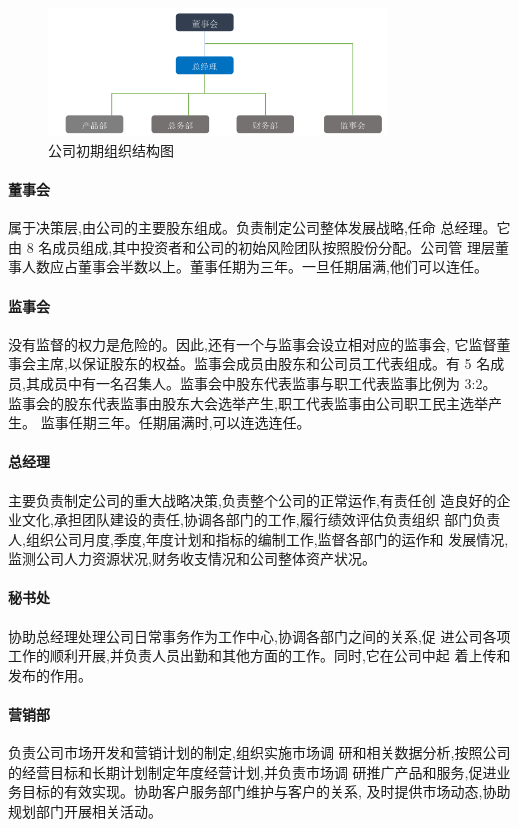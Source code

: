 \begin{figure}[htbp]
\centering
\label{figure:early-struct}
\includegraphics[width=0.8\textwidth]{../images/company/早期结构}
\caption{公司初期组织结构图}
\end{figure}

\paragraph{董事会}
属于决策层,由公司的主要股东组成。负责制定公司整体发展战略,任命
总经理。它由 8 名成员组成,其中投资者和公司的初始风险团队按照股份分配。公司管
理层董事人数应占董事会半数以上。董事任期为三年。一旦任期届满,他们可以连任。
\paragraph{ 监事会 }
没有监督的权力是危险的。因此,还有一个与监事会设立相对应的监事会,
它监督董事会主席,以保证股东的权益。监事会成员由股东和公司员工代表组成。有 5
名成员,其成员中有一名召集人。监事会中股东代表监事与职工代表监事比例为 3:2。
监事会的股东代表监事由股东大会选举产生,职工代表监事由公司职工民主选举产生。
监事任期三年。任期届满时,可以连选连任。
\paragraph{ 总经理 }
主要负责制定公司的重大战略决策,负责整个公司的正常运作,有责任创
造良好的企业文化,承担团队建设的责任,协调各部门的工作,履行绩效评估负责组织
部门负责人,组织公司月度,季度,年度计划和指标的编制工作,监督各部门的运作和
发展情况,监测公司人力资源状况,财务收支情况和公司整体资产状况。
\paragraph{秘书处}
协助总经理处理公司日常事务作为工作中心,协调各部门之间的关系,促
进公司各项工作的顺利开展,并负责人员出勤和其他方面的工作。同时,它在公司中起
着上传和发布的作用。

\paragraph{营销部}
负责公司市场开发和营销计划的制定,组织实施市场调
研和相关数据分析,按照公司的经营目标和长期计划制定年度经营计划,并负责市场调
研推广产品和服务,促进业务目标的有效实现。协助客户服务部门维护与客户的关系,
及时提供市场动态,协助规划部门开展相关活动。
